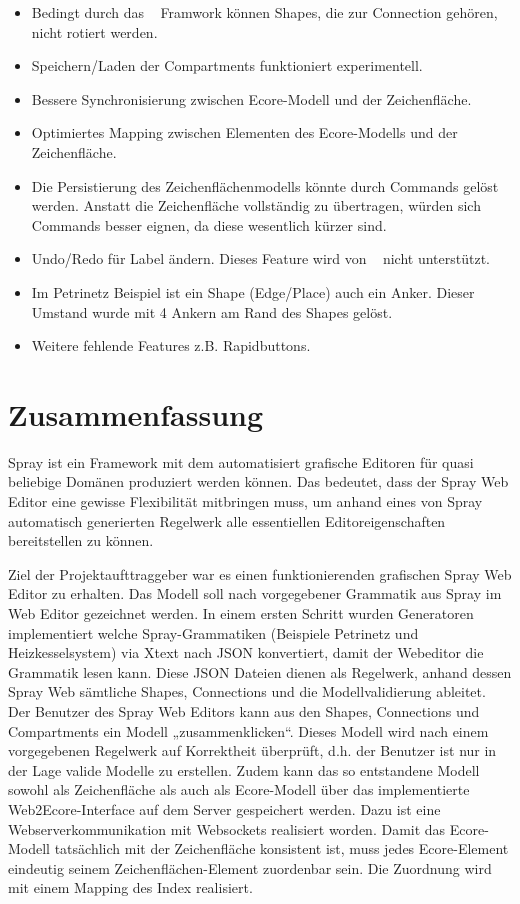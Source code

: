 \begin{itemize}
  \item Bedingt durch das \dd~ Framwork können Shapes, die zur Connection gehören, nicht rotiert werden.
  \item Speichern/Laden der Compartments funktioniert experimentell. 
  \item Bessere Synchronisierung zwischen Ecore-Modell und der Zeichenfläche.
  \item Optimiertes Mapping zwischen Elementen des Ecore-Modells und der Zeichenfläche.
  \item Die Persistierung des Zeichenflächenmodells könnte durch Commands gelöst werden. Anstatt die Zeichenfläche
  vollständig zu übertragen, würden sich Commands besser eignen, da diese wesentlich kürzer sind.
  \item Undo/Redo für Label ändern. Dieses Feature wird von \dd~ nicht unterstützt.
  \item Im Petrinetz Beispiel ist ein Shape (Edge/Place) auch ein Anker. Dieser Umstand wurde mit 4 Ankern am Rand des Shapes gelöst.
  \item Weitere fehlende Features z.B. Rapidbuttons.
\end{itemize}


\section{Zusammenfassung}

Spray ist ein Framework mit dem automatisiert grafische Editoren für quasi
beliebige Domänen produziert werden können. Das bedeutet, dass der Spray Web Editor
eine gewisse Flexibilität mitbringen muss, um anhand eines von
Spray automatisch generierten Regelwerk alle essentiellen Editoreigenschaften
bereitstellen zu können.

Ziel der Projektaufttraggeber war es einen funktionierenden grafischen Spray Web
Editor zu erhalten. Das Modell soll nach vorgegebener Grammatik aus Spray im Web Editor gezeichnet werden.
In einem ersten Schritt wurden Generatoren implementiert welche Spray-Grammatiken
(Beispiele Petrinetz und Heizkesselsystem) via Xtext nach JSON konvertiert, damit
der Webeditor die Grammatik lesen kann. Diese JSON Dateien dienen als Regelwerk,
anhand dessen Spray Web sämtliche Shapes, Connections und die Modellvalidierung
ableitet. Der Benutzer des Spray Web Editors kann aus den Shapes, Connections und Compartments ein Modell
„zusammenklicken“. Dieses Modell wird nach einem vorgegebenen Regelwerk auf
Korrektheit überprüft, d.h. der Benutzer ist nur in der Lage valide Modelle
zu erstellen. Zudem kann das so entstandene Modell sowohl als Zeichenfläche als auch als Ecore-Modell über
das implementierte Web2Ecore-Interface auf dem Server gespeichert werden. Dazu ist eine Webserverkommunikation mit Websockets
realisiert worden. Damit das Ecore-Modell tatsächlich mit der Zeichenfläche konsistent ist, muss jedes Ecore-Element
eindeutig seinem Zeichenflächen-Element zuordenbar sein. Die Zuordnung wird mit einem Mapping des Index realisiert.

